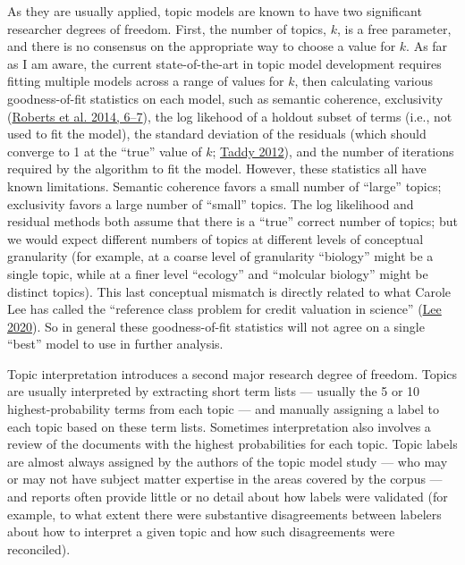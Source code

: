 \documentclass[
  11pt,
]{article}
\begin{document}
As they are usually applied, topic models are known to have two significant researcher degrees of freedom. First, the number of topics, \(k\), is a free parameter, and there is no consensus on the appropriate way to choose a value for \(k\). As far as I am aware, the current state-of-the-art in topic model development requires fitting multiple models across a range of values for \(k\), then calculating various goodness-of-fit statistics on each model, such as semantic coherence, exclusivity (\protect\hyperlink{ref-RobertsStructuralTopicModels2014}{Roberts et al. 2014, 6--7}), the log likehood of a holdout subset of terms (i.e., not used to fit the model), the standard deviation of the residuals (which should converge to 1 at the {``true''} value of \(k\); \protect\hyperlink{ref-TaddyEstimationSelectionTopic2012}{Taddy 2012}), and the number of iterations required by the algorithm to fit the model. However, these statistics all have known limitations. Semantic coherence favors a small number of ``large'' topics; exclusivity favors a large number of ``small'' topics. The log likelihood and residual methods both assume that there is a ``true'' correct number of topics; but we would expect different numbers of topics at different levels of conceptual granularity (for example, at a coarse level of granularity ``biology'' might be a single topic, while at a finer level ``ecology'' and ``molcular biology'' might be distinct topics). This last conceptual mismatch is directly related to what Carole Lee has called the ``reference class problem for credit valuation in science'' (\protect\hyperlink{ref-LeeReferenceClassProblem2020}{Lee 2020}). So in general these goodness-of-fit statistics will not agree on a single ``best'' model to use in further analysis.

Topic interpretation introduces a second major research degree of freedom. Topics are usually interpreted by extracting short term lists --- usually the 5 or 10 highest-probability terms from each topic --- and manually assigning a label to each topic based on these term lists. Sometimes interpretation also involves a review of the documents with the highest probabilities for each topic. Topic labels are almost always assigned by the authors of the topic model study --- who may or may not have subject matter expertise in the areas covered by the corpus --- and reports often provide little or no detail about how labels were validated (for example, to what extent there were substantive disagreements between labelers about how to interpret a given topic and how such disagreements were reconciled).
\end{document}
